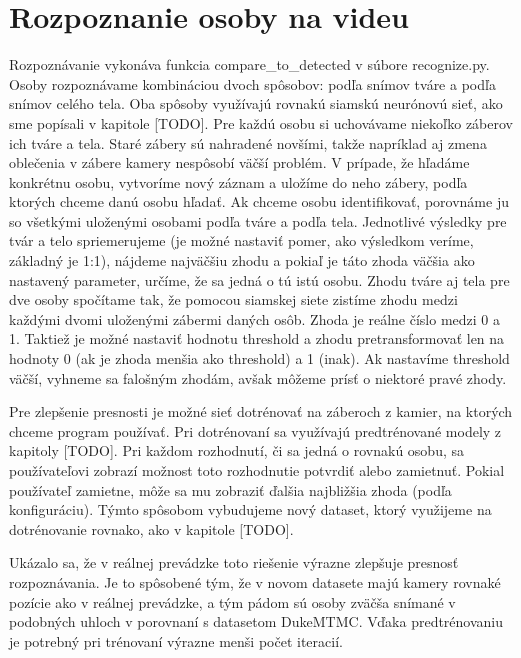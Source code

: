 \section{Rozpoznanie osoby na videu}
Rozpoznávanie vykonáva funkcia compare\_to\_detected v súbore recognize.py.
Osoby rozpoznávame  kombináciou dvoch spôsobov: podľa snímov tváre a podľa snímov celého tela.
Oba spôsoby využívajú rovnakú siamskú neurónovú sieť, ako sme popísali v kapitole [TODO]. 
Pre každú osobu si uchovávame niekoľko záberov ich tváre a tela. 
Staré zábery sú nahradené novšími, takže napríklad aj zmena oblečenia v zábere kamery nespôsobí väčší problém.
V prípade, že hľadáme konkrétnu osobu, vytvoríme nový záznam a uložíme do neho zábery, podľa ktorých chceme danú osobu hľadať.
Ak chceme osobu identifikovať, porovnáme ju so všetkými uloženými osobami podľa tváre a podľa tela.
Jednotlivé výsledky pre tvár a telo spriemerujeme (je možné nastaviť pomer, ako výsledkom veríme, základný je 1:1), nájdeme najväčšiu zhodu a pokiaľ je táto zhoda väčšia ako nastavený parameter, určíme, že sa jedná o tú istú osobu.
Zhodu tváre aj tela pre dve osoby spočítame tak, že pomocou siamskej siete zistíme zhodu medzi každými dvomi uloženými zábermi daných osôb.
Zhoda je reálne číslo medzi 0 a 1.
Taktiež je možné nastaviť hodnotu threshold a zhodu pretransformovať len na hodnoty 0 (ak je zhoda menšia ako threshold) a 1 (inak).
Ak nastavíme threshold väčší, vyhneme sa falošným zhodám, avšak môžeme prísť o niektoré pravé zhody.



Pre zlepšenie presnosti je možné sieť dotrénovať na záberoch z kamier, na ktorých chceme program používať.
Pri dotrénovaní sa využívajú predtrénované modely z kapitoly [TODO].
Pri každom rozhodnutí, či sa jedná o rovnakú osobu, sa používateľovi zobrazí možnost toto rozhodnutie potvrdiť alebo zamietnuť.
Pokial používateľ zamietne, môže sa mu zobraziť ďalšia najbližšia zhoda (podľa konfiguráciu).
Týmto spôsobom vybudujeme nový dataset, ktorý využijeme na dotrénovanie rovnako, ako v kapitole [TODO].

Ukázalo sa, že v reálnej prevádzke toto riešenie výrazne zlepšuje presnosť rozpoznávania.
Je to spôsobené tým, že v novom datasete majú kamery rovnaké pozície ako v reálnej prevádzke, a tým pádom sú osoby zväčša snímané v podobných uhloch v porovnaní s datasetom DukeMTMC.
Vďaka predtrénovaniu je potrebný pri trénovaní výrazne menši počet iteracií.


